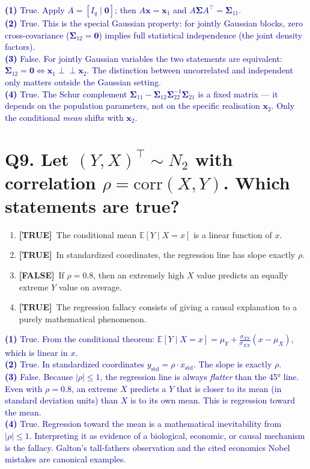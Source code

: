 \documentclass[12pt, a4paper]{article}
\newcommand{\T}{\textcolor{truegreen}{\textbf{[TRUE]}}}
\newcommand{\F}{\textcolor{falsered}{\textbf{[FALSE]}}}
\newcommand{\expl}[1]{\textcolor{darkblue}{\small #1}}
\begin{document}
\expl{
\textbf{(1)} True. Apply $A = [I_q \mid \mathbf{0}]$; then $A\mathbf{x} = \mathbf{x}_1$ and $A\boldsymbol{\Sigma} A^\top = \boldsymbol{\Sigma}_{11}$.\\
\textbf{(2)} True. This is the special Gaussian property: for jointly Gaussian blocks, zero cross-covariance ($\boldsymbol{\Sigma}_{12} = \mathbf{0}$) implies full statistical independence (the joint density factors).\\
\textbf{(3)} False. For jointly Gaussian variables the two statements are equivalent: $\boldsymbol{\Sigma}_{12} = \mathbf{0} \Leftrightarrow \mathbf{x}_1 \perp\!\!\!\perp \mathbf{x}_2$. The distinction between uncorrelated and independent only matters outside the Gaussian setting.\\
\textbf{(4)} True. The Schur complement $\boldsymbol{\Sigma}_{11} - \boldsymbol{\Sigma}_{12}\boldsymbol{\Sigma}_{22}^{-1}\boldsymbol{\Sigma}_{21}$ is a fixed matrix — it depends on the population parameters, not on the specific realisation $\mathbf{x}_2$. Only the conditional \textit{mean} shifts with $\mathbf{x}_2$.
}

\vspace{1.5em}

\section*{Q9. Let $(Y, X)^\top \sim N_2$ with correlation $\rho = \mathrm{corr}(X, Y)$. Which statements are true?}

\begin{enumerate}[label=(\arabic*)]
  \item \T\ The conditional mean $\mathbb{E}[Y \mid X = x]$ is a linear function of $x$.
  \item \T\ In standardized coordinates, the regression line has slope exactly $\rho$.
  \item \F\ If $\rho = 0.8$, then an extremely high $X$ value predicts an equally extreme $Y$ value on average.
  \item \T\ The regression fallacy consists of giving a causal explanation to a purely mathematical phenomenon.
\end{enumerate}

\expl{
\textbf{(1)} True. From the conditional theorem: $\mathbb{E}[Y \mid X = x] = \mu_Y + \frac{\sigma_{XY}}{\sigma_{XX}}(x - \mu_X)$, which is linear in $x$.\\
\textbf{(2)} True. In standardized coordinates $y_{\mathrm{std}} = \rho \cdot x_{\mathrm{std}}$. The slope is exactly $\rho$.\\
\textbf{(3)} False. Because $|\rho| \leq 1$, the regression line is always \textit{flatter} than the 45° line. Even with $\rho = 0.8$, an extreme $X$ predicts a $Y$ that is closer to its mean (in standard deviation units) than $X$ is to its own mean. This is regression toward the mean.\\
\textbf{(4)} True. Regression toward the mean is a mathematical inevitability from $|\rho| \leq 1$. Interpreting it as evidence of a biological, economic, or causal mechanism is the fallacy. Galton's tall-fathers observation and the cited economics Nobel mistakes are canonical examples.
}
\end{document}
